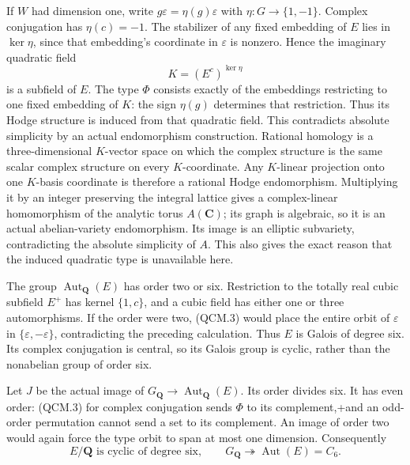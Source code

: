 If $W$ had dimension one, write
$g\varepsilon=\eta(g)\varepsilon$ with
$\eta:G\to\{1,-1\}$. Complex conjugation has
$\eta(c)=-1$. The stabilizer of any fixed embedding of
$E$ lies in $\ker\eta$, since that embedding's coordinate
in $\varepsilon$ is nonzero. Hence the imaginary quadratic
field
\[
                    K=(E^c)^{\ker\eta}
\]
is a subfield of $E$. The type $\Phi$ consists exactly of
the embeddings restricting to one fixed embedding of
$K$: the sign $\eta(g)$ determines that restriction.
Thus its Hodge structure is induced from that quadratic
field. This contradicts absolute simplicity by an actual
endomorphism construction. Rational homology is a
three-dimensional $K$-vector space on which the complex
structure is the same scalar complex structure on every
$K$-coordinate. Any $K$-linear projection onto one
$K$-basis coordinate is therefore a rational Hodge
endomorphism. Multiplying it by an integer preserving the
integral lattice gives a complex-linear homomorphism of
the analytic torus $A(\mathbf C)$; its graph is algebraic,
so it is an actual abelian-variety endomorphism. Its image
is an elliptic subvariety, contradicting the absolute
simplicity of $A$. This also gives the exact reason that
the induced quadratic type is unavailable here.

The group $\operatorname{Aut}_{\mathbf Q}(E)$ has order
two or six. Restriction to the totally real cubic
subfield $E^+$ has kernel $\{1,c\}$, and a cubic field
has either one or three automorphisms. If the order
were two, (QCM.3) would place the entire orbit of
$\varepsilon$ in $\{\varepsilon,-\varepsilon\}$,
contradicting the preceding calculation. Thus $E$ is
Galois of degree six. Its complex conjugation is central,
so its Galois group is cyclic, rather than the
nonabelian group of order six.

Let $J$ be the actual image of
$G_{\mathbf Q}\to\operatorname{Aut}_{\mathbf Q}(E)$.
Its order divides six. It has even order: (QCM.3) for
complex conjugation sends $\Phi$ to its complement,+and an odd-order permutation cannot send a set to its
complement. An image of order two would again force
the type orbit to span at most one dimension.
Consequently
\[
 E/\mathbf Q\text{ is cyclic of degree six},\qquad
 G_{\mathbf Q}\twoheadrightarrow\operatorname{Aut}(E)=C_6.
                                                               \tag{QCM.4}
\]

